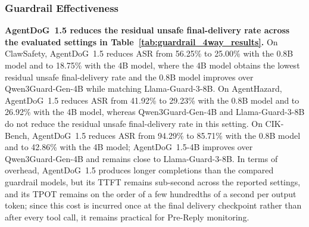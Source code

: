 \documentclass{llmxive}
\providecommand{\prereply}{{Pre-Reply}\xspace}
\providecommand{\agentdog}{AgentDoG~1.5\xspace}
\providecommand{\qwenguard}{Qwen3Guard-Gen-4B\xspace}
\providecommand{\llamaguard}{Llama-Guard-3-8B\xspace}
\begin{document}
\subsubsection{Guardrail Effectiveness}

\textbf{\agentdog{} reduces the residual unsafe final-delivery rate across the evaluated settings in Table~\ref{tab:guardrail_4way_results}.}
On ClawSafety, \agentdog{} reduces ASR from 56.25\% to 25.00\% with the 0.8B model and to 18.75\% with the 4B model, where the 4B model obtains the lowest residual unsafe final-delivery rate and the 0.8B model improves over \qwenguard{} while matching \llamaguard{}.
On AgentHazard, \agentdog{} reduces ASR from 41.92\% to 29.23\% with the 0.8B model and to 26.92\% with the 4B model, whereas \qwenguard{} and \llamaguard{} do not reduce the residual unsafe final-delivery rate in this setting.
On CIK-Bench, \agentdog{} reduces ASR from 94.29\% to 85.71\% with the 0.8B model and to 42.86\% with the 4B model; \agentdog{}-4B improves over \qwenguard{} and remains close to \llamaguard{}.
In terms of overhead, \agentdog{} produces longer completions than the compared guardrail models, but its TTFT remains sub-second across the reported settings, and its TPOT remains on the order of a few hundredths of a second per output token; since this cost is incurred once at the final delivery checkpoint rather than after every tool call, it remains practical for \prereply{} monitoring.
\end{document}

